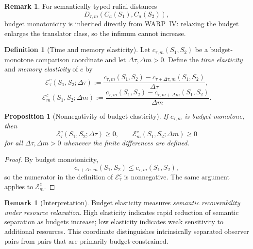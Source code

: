 \documentclass[11pt,twoside]{article}
\newtheorem{proposition}[theorem]{Proposition}
\theoremstyle{definition}
\newtheorem{definition}[theorem]{Definition}
\newtheorem{remark}[theorem]{Remark}
\begin{document}
\begin{remark}
\label{rem:budget-monotone-coordinate}
For semantically typed rulial distances
\[
  D_{\tau,m}(C_a(S_1),C_a(S_2)),
\]
budget monotonicity is inherited directly from WARP~IV: relaxing the budget enlarges the translator class, so the infimum cannot increase.
\end{remark}

\begin{definition}[Time and memory elasticity]
\label{def:time-memory-elasticity}
Let \(c_{\tau,m}(S_1,S_2)\) be a budget-monotone comparison coordinate and let \(\Delta\tau,\Delta m > 0\). Define the \emph{time elasticity} and \emph{memory elasticity} of \(c\) by
\[
  \mathcal{E}^{c}_{\tau}(S_1,S_2;\Delta\tau)
  :=
  \frac{
    c_{\tau,m}(S_1,S_2) - c_{\tau+\Delta\tau,m}(S_1,S_2)
  }{\Delta\tau},
\]
\[
  \mathcal{E}^{c}_{m}(S_1,S_2;\Delta m)
  :=
  \frac{
    c_{\tau,m}(S_1,S_2) - c_{\tau,m+\Delta m}(S_1,S_2)
  }{\Delta m}.
\]
\end{definition}

\begin{proposition}[Nonnegativity of budget elasticity]
\label{prop:elasticity-nonnegative}
If \(c_{\tau,m}\) is budget-monotone, then
\[
  \mathcal{E}^{c}_{\tau}(S_1,S_2;\Delta\tau)\ge 0,
  \qquad
  \mathcal{E}^{c}_{m}(S_1,S_2;\Delta m)\ge 0
\]
for all \(\Delta\tau,\Delta m > 0\) whenever the finite differences are defined.
\end{proposition}

\begin{proof}
By budget monotonicity,
\[
  c_{\tau+\Delta\tau,m}(S_1,S_2)\le c_{\tau,m}(S_1,S_2),
\]
so the numerator in the definition of \(\mathcal{E}^{c}_{\tau}\) is nonnegative. The same argument applies to \(\mathcal{E}^{c}_{m}\).
\end{proof}

\begin{remark}[Interpretation]
\label{rem:elasticity-interpretation}
Budget elasticity measures \emph{semantic recoverability under resource relaxation}. High elasticity indicates rapid reduction of semantic separation as budgets increase; low elasticity indicates weak sensitivity to additional resources. This coordinate distinguishes intrinsically separated observer pairs from pairs that are primarily budget-constrained.
\end{remark}
\end{document}
